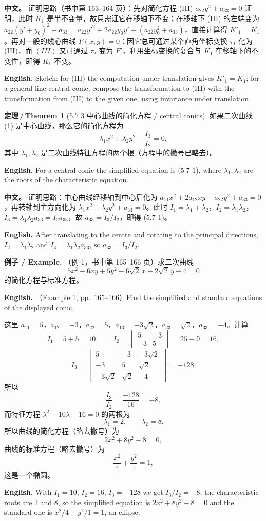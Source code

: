 \documentclass[UTF8,11pt,a4paper]{ctexart}
\newcommand{\APS}[2]{\par\noindent\textbf{中文。} #1\par\noindent\textbf{English.} #2\par\smallskip}
\newcommand{\EN}[1]{\par\noindent \textbf{English.} #1\par}
\newcommand{\EX}[2]{\par\noindent \textbf{例子 / Example.} #1\par\EN{#2}}
\theoremstyle{definition}
\newtheorem*{theorem}{定理\,/\,Theorem}
\begin{document}
\APS{证明思路（书中第 163--164 页）：先对简化方程 (III) $a_{22}y^2+a_{33}=0$ 证明，此时 $K_1$ 是半不变量，故只需证它在移轴下不变；在移轴下 (III) 的左端变为 $a_{22}(y'+y_0)^2+a_{33}=a_{22}y'^2+2a_{22}y_0y'+(a_{22}y_0^2+a_{33})$，直接计算得 $K'_1=K_1$。再对一般的线心曲线 $F(x,y)=0$：因它总可通过某个直角坐标变换 $\tau_1$ 化为 (III)，而 $(III)$ 又可通过 $\tau_2$ 变为 $F'$，利用坐标变换的复合与 $K_1$ 在移轴下的不变性，即得 $K_1$ 不变。}{Sketch: for (III) the computation under translation gives $K'_1=K_1$; for a general line-central conic, compose the transformation to (III) with the transformation from (III) to the given one, using invariance under translation.}

\begin{theorem}[5.7.3 中心曲线的简化方程 / central conics]\label{thm:inv-central}
如果二次曲线 (1) 是中心曲线，那么它的简化方程为
\[
\lambda_1x^2+\lambda_2y^2+\frac{I_3}{I_2}=0,\tag{5.7-1}
\]
其中 $\lambda_1,\lambda_2$ 是二次曲线特征方程的两个根（方程中的撇号已略去）。
\EN{For a central conic the simplified equation is (5.7-1), where $\lambda_1,\lambda_2$ are the roots of the characteristic equation.}
\end{theorem}

\APS{证明思路：中心曲线经移轴到中心后化为 $a_{11}x^2+2a_{12}xy+a_{22}y^2+a_{33}=0$，再转轴到主方向化为 $\lambda_1x^2+\lambda_2y^2+a_{33}=0$。此时 $I_1=\lambda_1+\lambda_2$，$I_2=\lambda_1\lambda_2$，$I_3=\lambda_1\lambda_2a_{33}=I_2a_{33}$，故 $a_{33}=I_3/I_2$，即得 (5.7-1)。}{After translating to the centre and rotating to the principal directions, $I_2=\lambda_1\lambda_2$ and $I_3=\lambda_1\lambda_2a_{33}$, so $a_{33}=I_3/I_2$.}

\EX{（例 1，书中第 165--166 页）求二次曲线
\[
5x^2-6xy+5y^2-6\sqrt2\,x+2\sqrt2\,y-4=0
\]
的简化方程与标准方程。}{（Example 1, pp.~165--166）Find the simplified and standard equations of the displayed conic.}
这里 $a_{11}=5$，$a_{12}=-3$，$a_{22}=5$，$a_{13}=-3\sqrt2$，$a_{23}=\sqrt2$，$a_{33}=-4$。计算
\[
I_1=5+5=10,\qquad I_2=\begin{vmatrix}5&-3\\ -3&5\end{vmatrix}=25-9=16,
\]
\[
I_3=\begin{vmatrix}5&-3&-3\sqrt2\\ -3&5&\sqrt2\\ -3\sqrt2&\sqrt2&-4\end{vmatrix}=-128.
\]
所以
\[
\frac{I_3}{I_2}=\frac{-128}{16}=-8,
\]
而特征方程 $\lambda^2-10\lambda+16=0$ 的两根为
\[
\lambda_1=2,\qquad \lambda_2=8.
\]
所以曲线的简化方程（略去撇号）为
\[
2x^2+8y^2-8=0,
\]
曲线的标准方程（略去撇号）为
\[
\frac{x^2}{4}+\frac{y^2}{1}=1,
\]
这是一个椭圆。
\EN{With $I_1=10$, $I_2=16$, $I_3=-128$ we get $I_3/I_2=-8$; the characteristic roots are $2$ and $8$, so the simplified equation is $2x^2+8y^2-8=0$ and the standard one is $x^2/4+y^2/1=1$, an ellipse.}
\end{document}
